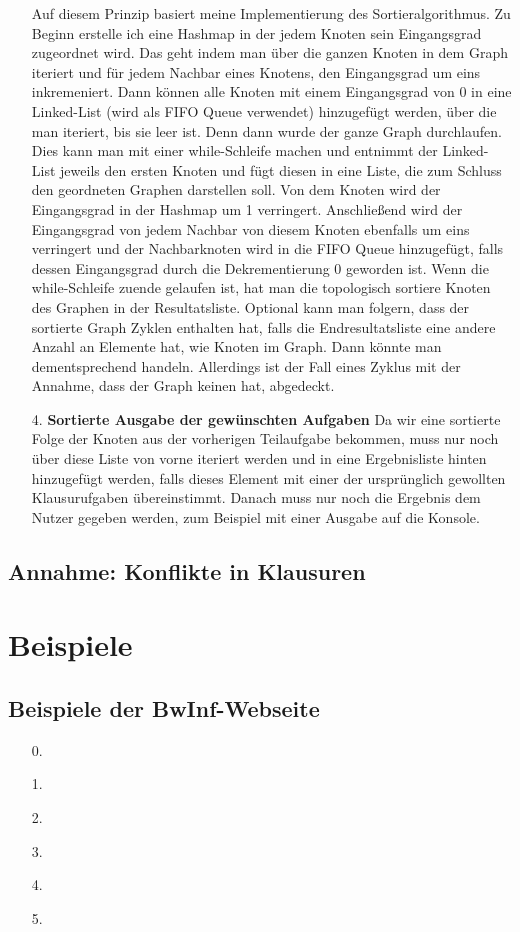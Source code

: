 \documentclass[a4paper,10pt,ngerman]{scrartcl}
\begin{document}
\begin{itemize}
  Auf diesem Prinzip basiert meine Implementierung des Sortieralgorithmus.
  \newline
  Zu Beginn erstelle ich eine Hashmap in der jedem Knoten sein Eingangsgrad zugeordnet wird. Das geht indem man über die ganzen Knoten in dem Graph iteriert und für jedem Nachbar eines Knotens, den Eingangsgrad um eins inkremeniert.
  Dann können alle Knoten mit einem Eingangsgrad von 0 in eine Linked-List (wird als FIFO Queue verwendet) hinzugefügt werden, über die man iteriert, bis sie leer ist. Denn dann wurde der ganze Graph durchlaufen. 
  Dies kann man mit einer while-Schleife machen und entnimmt der Linked-List jeweils den ersten Knoten und fügt diesen in eine Liste, die zum Schluss den geordneten Graphen darstellen soll. Von dem Knoten wird der 
  Eingangsgrad in der Hashmap um 1 verringert. Anschließend wird der Eingangsgrad von jedem Nachbar von diesem Knoten ebenfalls um eins verringert und der Nachbarknoten wird in die FIFO Queue hinzugefügt, falls dessen Eingangsgrad
  durch die Dekrementierung 0 geworden ist. 
  \newline
  Wenn die while-Schleife zuende gelaufen ist, hat man die topologisch sortiere Knoten des Graphen in der Resultatsliste. Optional kann man folgern, dass der sortierte Graph Zyklen enthalten hat, falls die Endresultatsliste eine andere
  Anzahl an Elemente hat, wie Knoten im Graph. Dann könnte man dementsprechend handeln. Allerdings ist der Fall eines Zyklus mit der Annahme, dass der Graph keinen hat, abgedeckt.
  \item[4.] \textbf{Sortierte Ausgabe der gewünschten Aufgaben}
  Da wir eine sortierte Folge der Knoten aus der vorherigen Teilaufgabe bekommen, muss nur noch über diese Liste von vorne iteriert werden und in eine Ergebnisliste hinten hinzugefügt werden, falls dieses Element mit einer der ursprünglich gewollten Klausurufgaben übereinstimmt.
  Danach muss nur noch die Ergebnis dem Nutzer gegeben werden, zum Beispiel mit einer Ausgabe auf die Konsole.


\end{itemize}
\subsection{Annahme: Konflikte in Klausuren}

\section{Beispiele}
\subsection{Beispiele der BwInf-Webseite}
\begin{itemize}
  \item [0.] 
  \item [1.] 
  \item [2.]
  \item [3.]
  \item [4.]
  \item [5.]
\end{itemize}
\end{document}
